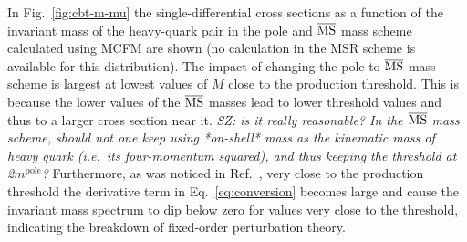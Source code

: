 \documentclass[12pt,a4paper]{article}
\newcommand{\msbar}{\ensuremath{\overline{\rm MS}}\xspace}
\newcommand{\polem}[1][]{\ensuremath{m_{#1}^{\text{pole}}}\xspace}
\begin{document}
In Fig.~\ref{fig:cbt-m-mu} the single-differential cross sections as a function of the invariant mass of the heavy-quark pair in the pole and \msbar mass scheme calculated using MCFM are shown (no calculation in the MSR scheme is available for this distribution). The impact of changing the pole to \msbar mass scheme is largest at lowest values of $M$ close to the production threshold. This is because the lower values of the \msbar masses lead to lower threshold values and thus to a larger cross section near it. {\color{blue}\it SZ: is it really reasonable? In the \msbar mass scheme, should not one keep using *on-shell* mass as the kinematic mass of heavy quark (i.e.\ its four-momentum squared), and thus keeping the threshold at 2\polem?} Furthermore, as was noticed in Ref.~\cite{Dowling:2013baa}, very close to the production threshold the derivative term in Eq.~\ref{eq:conversion} becomes large and cause the invariant mass spectrum to dip below zero for values very close to the threshold, indicating the breakdown of fixed-order perturbation theory.
\end{document}
